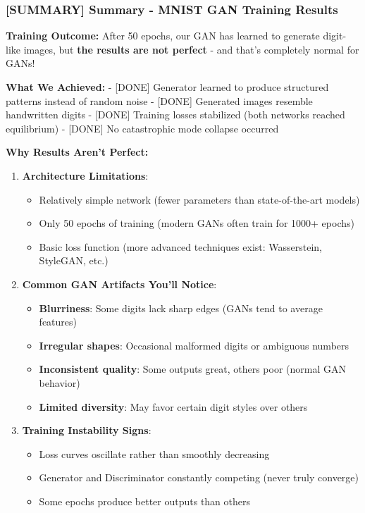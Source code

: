 \documentclass[11pt]{article}
\providecommand{\tightlist}{%
      \setlength{\itemsep}{0pt}\setlength{\parskip}{0pt}}
\begin{document}
    \subsubsection{{[}SUMMARY{]} Summary - MNIST GAN Training
Results}\label{summary-summary---mnist-gan-training-results}

\textbf{Training Outcome:} After 50 epochs, our GAN has learned to
generate digit-like images, but \textbf{the results are not perfect} -
and that's completely normal for GANs!

\textbf{What We Achieved:} - {[}DONE{]} Generator learned to produce
structured patterns instead of random noise - {[}DONE{]} Generated
images resemble handwritten digits - {[}DONE{]} Training losses
stabilized (both networks reached equilibrium) - {[}DONE{]} No
catastrophic mode collapse occurred

\textbf{Why Results Aren't Perfect:}

\begin{enumerate}
\def\labelenumi{\arabic{enumi}.}
\tightlist
\item
  \textbf{Architecture Limitations}:

  \begin{itemize}
  \tightlist
  \item
    Relatively simple network (fewer parameters than state-of-the-art
    models)
  \item
    Only 50 epochs of training (modern GANs often train for 1000+
    epochs)
  \item
    Basic loss function (more advanced techniques exist: Wasserstein,
    StyleGAN, etc.)
  \end{itemize}
\item
  \textbf{Common GAN Artifacts You'll Notice}:

  \begin{itemize}
  \tightlist
  \item
    \textbf{Blurriness}: Some digits lack sharp edges (GANs tend to
    average features)
  \item
    \textbf{Irregular shapes}: Occasional malformed digits or ambiguous
    numbers
  \item
    \textbf{Inconsistent quality}: Some outputs great, others poor
    (normal GAN behavior)
  \item
    \textbf{Limited diversity}: May favor certain digit styles over
    others
  \end{itemize}
\item
  \textbf{Training Instability Signs}:

  \begin{itemize}
  \tightlist
  \item
    Loss curves oscillate rather than smoothly decreasing
  \item
    Generator and Discriminator constantly competing (never truly
    converge)
  \item
    Some epochs produce better outputs than others
  \end{itemize}
\end{enumerate}
\end{document}
